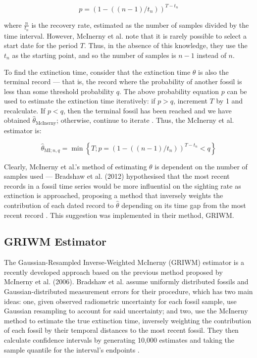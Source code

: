 \[
p = \left( 1 - \left( (n-1)/t_n \right) \right)^{T - t_n}
\]

where $\frac{n}{t_n}$ is the recovery rate, estimated as the number of samples divided by the time interval. However, McInerny et al. note that it is rarely possible to select a start date for the period $T$. Thus, in the absence of this knowledge, they use the $t_n$ as the starting point, and so the number of samples is $n-1$ instead of $n$.

To find the extinction time, consider that the extinction time $\theta$ is also the terminal record --- that is, the record where the probability of another fossil is less than some threshold probability $q$. The above probability equation $p$ can be used to estimate the extinction time iteratively: if $p > q$, increment $T$ by 1 and recalculate. If $p < q$, then the terminal fossil has been reached and we have obtained $\hat\theta_{\text{McInerny}}$; otherwise, continue to iterate \parencite{Bradshaw2012}. Thus, the McInerny et al. estimator is:

\begin{equation}
    \hat\theta_{\text{MI}; n, q} = \min\left\{ T ; p = \left( 1 - \left( (n-1)/t_n \right) \right)^{T - t_n} < q \right\}
\end{equation}

Clearly, McInerny et al.'s method of estimating $\theta$ is dependent on the number of samples used --- Bradshaw et al. (2012) hypothesised that the most recent records in a fossil time series would be more influential on the sighting rate as extinction is approached, proposing a method that inversely weights the contribution of each dated record to $\hat\theta$ depending on its time gap from the most recent record \parencite{Bradshaw2012}. This suggestion was implemented in their method, GRIWM.

\subsection{GRIWM Estimator}

The Gaussian-Resampled Inverse-Weighted McInerny (GRIWM) estimator is a recently developed approach based on the previous method proposed by McInerny et al. (2006). Bradshaw et al. assume uniformly distributed fossils and Gaussian-distributed measurement errors for their procedure, which has two main ideas: one, given observed radiometric uncertainty for each fossil sample, use Gaussian resampling to account for said uncertainty; and two, use the McInerny method to estimate the true extinction time, inversely weighting the contribution of each fossil by their temporal distances to the most recent fossil. They then calculate confidence intervals by generating 10,000 estimates and taking the sample quantile for the interval's endpoints \parencite{Bradshaw2012}.

